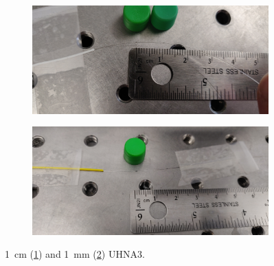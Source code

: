 \begin{figure}[t]
    \centering
    \begin{subfigure}[b]{0.49\textwidth}
        \centering
        \includegraphics[width=\textwidth]{figs/4-Raman/1cm UHNA3.jpeg}
        \caption{}
        \label{fig:Raman:1cmUHNA3pic}
    \end{subfigure}
    \hfill
    \begin{subfigure}[b]{0.49\textwidth}
        \centering
        \includegraphics[width=\textwidth]{figs/4-Raman/1mm UHNA3 in apparatus.jpeg}
        \caption{}
        \label{fig:Raman:1mmUHNA3pic}
    \end{subfigure}
    \caption{\SI{1}{\centi\meter} (\ref{fig:Raman:1cmUHNA3pic}) and \SI{1}{\milli\meter} (\ref{fig:Raman:1mmUHNA3pic}) \ac{UHNA3}.}
    \label{fig:Raman:UHNA3}
\end{figure}

